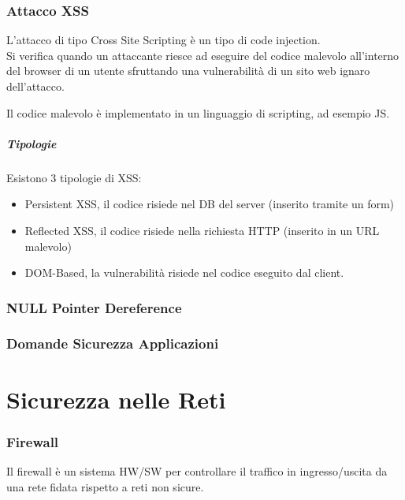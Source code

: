 \documentclass[12pt, a4paper, openany]{book}
\begin{document}
\subsection{Attacco XSS}
L'attacco di tipo Cross Site Scripting è un tipo di code injection.
\\Si verifica quando un attaccante riesce ad eseguire del codice malevolo all'interno del browser di un utente sfruttando una vulnerabilità di un sito web ignaro dell'attacco.

Il codice malevolo è implementato in un linguaggio di scripting, ad esempio JS.

\paragraph{Tipologie}
Esistono 3 tipologie di XSS:
\begin{itemize}
    \item Persistent XSS, il codice risiede nel DB del server (inserito tramite un form)
    \item Reflected XSS, il codice risiede nella richiesta HTTP (inserito in un URL malevolo)
    \item DOM-Based, la vulnerabilità risiede nel codice eseguito dal client.
\end{itemize}

\subsection{NULL Pointer Dereference} %


\subsection{Domande Sicurezza Applicazioni}

\chapter{Sicurezza nelle Reti}
\subsection{Firewall}
Il firewall è un sistema HW/SW per controllare il traffico in ingresso/uscita da una rete fidata rispetto a reti non sicure.
\end{document}
